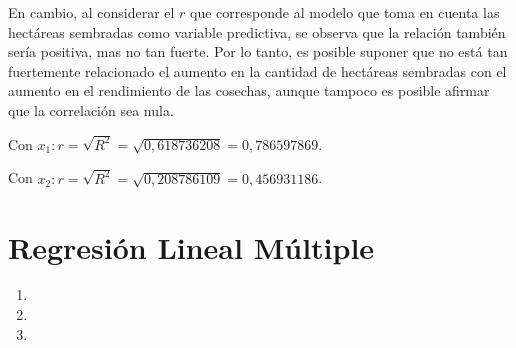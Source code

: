 \documentclass[spanish,12pt,a4paper]{article}
\begin{document}
\begin{enumerate}[label=\alph*)]
		En cambio, al considerar el $r$ que corresponde al modelo que toma en cuenta las hectáreas sembradas como variable predictiva, se observa que la relación también sería positiva, mas no tan fuerte. Por lo tanto, es posible suponer que no está tan fuertemente relacionado el aumento en la cantidad de hectáreas sembradas con el aumento en el rendimiento de las cosechas, aunque tampoco es posible afirmar que la correlación sea nula.
		
		Con $x_1: r = \sqrt{R^2} = \sqrt{0,618736208} = 0,786597869$.
		
		Con $x_2: r = \sqrt{R^2} = \sqrt{0,208786109} = 0,456931186$.
	\end{enumerate}
	
	\section{Regresión Lineal Múltiple}
	
	\begin{enumerate}[label=\alph*)]
		\item 
		\item 
		\item
	\end{enumerate}
\end{document}
